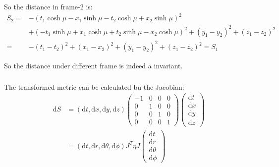 \documentclass[]{ctexart}
\newcommand{\di}{\mathrm{d}}
\begin{document}
			So the distance in frame-2 is:
				\begin{equation*}
				\begin{aligned}
					S_2=&-(t_1\cosh \mu -x_1\sinh\mu-t_2\cosh \mu +x_2\sinh\mu )^2\\
					&+(-t_1\sinh \mu +x_1\cosh\mu+t_2\sinh \mu -x_2\cosh\mu)^2+(y_1-y_2)^2+(z_1-z_2)^2\\
					=&-(t_1-t_2)^2+(x_1-x_2)^2+(y_1-y_2)^2+(z_1-z_2)^2=S_1
				\end{aligned}
				\end{equation*}
			
			So the distance under different frame is indeed a invariant. 
		
		\subsubsection{}
			The transformed metric can be calculated bu the Jacobian:
				\begin{equation*}
				\begin{aligned}
					\di S&=
					\left(\di t, \di x,\di y,\di z\right)
					\begin{pmatrix}
						-1 & 0 & 0 & 0\\
						0  & 1 & 0 & 0\\
						0  & 0 & 1 & 0\\
						0  & 0 & 0 & 1
					\end{pmatrix}
					\begin{pmatrix}
						\di t \\
						\di x\\
						\di y\\
						\di z
					\end{pmatrix}\\
					&=
					\left(\di t, \di r,\di \theta,\di \phi \right)
					J^T\eta J
					\begin{pmatrix}
					\di t \\
					\di r\\
					\di \theta\\
					\di \phi
					\end{pmatrix}
				\end{aligned}
				\end{equation*}
			
\end{document}
